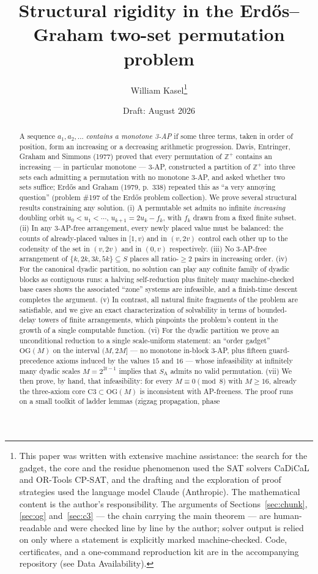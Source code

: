 \documentclass[11pt]{article}
\title{Structural rigidity in the Erd\H{o}s--Graham two-set permutation problem}
\author{William Kasel\thanks{This paper was written with extensive machine
assistance: the search for the gadget, the core and the residue phenomenon
used the SAT solvers CaDiCaL and OR-Tools CP-SAT, and the drafting and the
exploration of proof strategies used the language model Claude (Anthropic).
The mathematical content is the author's responsibility. The arguments of
Sections~\ref{sec:chunk}, \ref{sec:og} and~\ref{sec:c3} --- the chain
carrying the main theorem --- are human-readable and were checked line by
line by the author; solver output is relied on only where a statement is
explicitly marked machine-checked. Code, certificates, and a one-command
reproduction kit are in the accompanying repository (see Data
Availability).}}
\date{Draft: August 2026}
\theoremstyle{definition}
\newcommand{\Z}{\mathbb{Z}}
\newcommand{\SA}{S_{\mathrm{A}}}
\newcommand{\OG}{\mathrm{OG}}
\begin{document}
\maketitle

\begin{abstract}
A sequence $a_1, a_2, \dots$ \emph{contains a monotone 3-AP} if some three terms,
taken in order of position, form an increasing or a decreasing arithmetic
progression. Davis, Entringer, Graham and Simmons (1977) proved that every
permutation of $\Z^+$ contains an increasing --- in particular monotone --- 3-AP,
constructed a partition of $\Z^+$ into three sets each admitting a permutation
with no monotone 3-AP, and asked whether two sets suffice; Erd\H{o}s and Graham
(1979, p.~338) repeated this as ``a very annoying question'' (problem \#197 of
the Erd\H{o}s problem collection). We prove several structural results constraining any solution.
(i) A permutable set admits no infinite \emph{increasing} doubling orbit
$u_0<u_1<\cdots$, $u_{k+1}=2u_k-f_k$, with
$f_k$ drawn from a fixed finite subset. (ii) In any 3-AP-free arrangement, every newly placed value must be
balanced: the counts of already-placed values in $[1,v)$ and in $(v,2v)$
control each other up to the codensity of the set in $(v,2v)$ and in
$(0,v)$ respectively.
(iii) No 3-AP-free arrangement of $\{k,2k,3k,5k\}\subseteq S$ places all
ratio-$\ge 2$ pairs in increasing order. (iv) For the canonical dyadic partition,
no solution can play any cofinite family of dyadic blocks as contiguous runs: a
halving self-reduction plus finitely many machine-checked base cases shows the
associated ``zone'' systems are infeasible, and a finish-time descent completes
the argument. (v) In contrast, all natural finite fragments of the problem are
satisfiable, and we give an exact characterization of solvability in terms of
bounded-delay towers of finite arrangements, which pinpoints the problem's
content in the growth of a single computable function.
(vi) For the dyadic partition we prove an unconditional reduction to a single
scale-uniform statement: an ``order gadget'' $\OG(M)$ on the interval
$(M, 2M]$ --- no monotone in-block $3$-AP, plus fifteen guard-precedence
axioms induced by the values $15$ and $16$ --- whose infeasibility at
infinitely many dyadic scales $M = 2^{2t-1}$ implies that $\SA$ admits no
valid permutation.
(vii) We then prove, by hand, that infeasibility: for every
$M \equiv 0 \pmod 8$ with $M \ge 16$, already the three-axiom core
$\mathrm{C3} \subset \OG(M)$ is inconsistent with AP-freeness. The proof
runs on a small toolkit of ladder lemmas (zigzag propagation, phase

\end{abstract}
\end{document}
